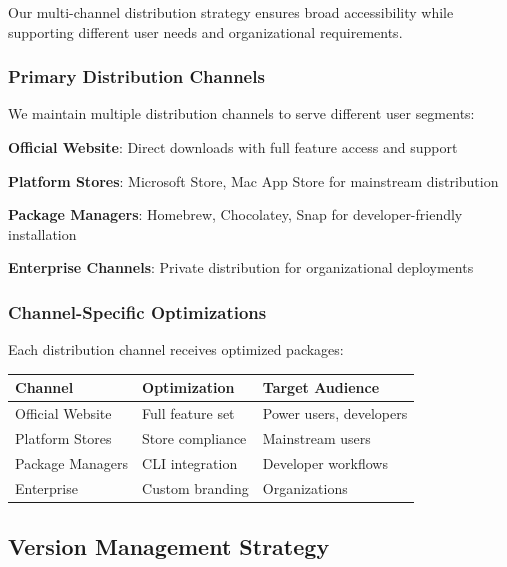 Our multi-channel distribution strategy ensures broad accessibility while supporting different user needs and organizational requirements.

\subsubsection*{Primary Distribution Channels}

We maintain multiple distribution channels to serve different user segments:

\begin{expandedlist}
    \item \textbf{Official Website}: Direct downloads with full feature access and support
    \item \textbf{Platform Stores}: Microsoft Store, Mac App Store for mainstream distribution
    \item \textbf{Package Managers}: Homebrew, Chocolatey, Snap for developer-friendly installation
    \item \textbf{Enterprise Channels}: Private distribution for organizational deployments
\end{expandedlist}

\subsubsection*{Channel-Specific Optimizations}

Each distribution channel receives optimized packages:

\begin{center}
\begin{tabular}{@{}lll@{}}
\toprule
\textbf{Channel} & \textbf{Optimization} & \textbf{Target Audience} \\
\midrule
Official Website & Full feature set & Power users, developers \\
Platform Stores & Store compliance & Mainstream users \\
Package Managers & CLI integration & Developer workflows \\
Enterprise & Custom branding & Organizations \\
\bottomrule
\end{tabular}
\end{center}

\subsection*{Version Management Strategy}

